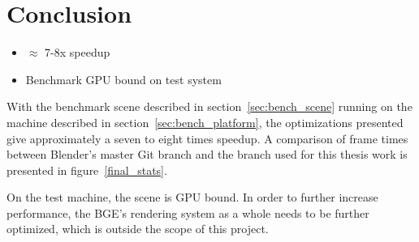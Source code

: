 \section{Conclusion}
\ifsummaries
\begin{itemize}
 \item $\approx$ 7-8x speedup
 \item Benchmark GPU bound on test system
\end{itemize}
\fi

With the benchmark scene described in section~\ref{sec:bench_scene} running on the machine described in section~\ref{sec:bench_platform}, the optimizations presented give approximately a seven to eight times speedup.
A comparison of frame times between Blender's master Git branch and the branch used for this thesis work is presented in figure~\ref{final_stats}.


On the test machine, the scene is GPU bound. In order to further increase performance, the BGE's rendering system as a whole needs to be further optimized, which is outside the scope of this project.

